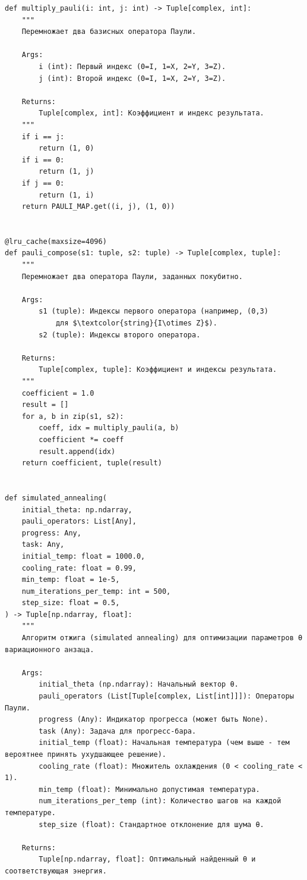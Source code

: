 \documentclass[a4paper]{report}
\begin{document}
\begin{lstlisting}
def multiply_pauli(i: int, j: int) -> Tuple[complex, int]:
    """
    Перемножает два базисных оператора Паули.

    Args:
        i (int): Первый индекс (0=I, 1=X, 2=Y, 3=Z).
        j (int): Второй индекс (0=I, 1=X, 2=Y, 3=Z).

    Returns:
        Tuple[complex, int]: Коэффициент и индекс результата.
    """
    if i == j:
        return (1, 0)
    if i == 0:
        return (1, j)
    if j == 0:
        return (1, i)
    return PAULI_MAP.get((i, j), (1, 0))


@lru_cache(maxsize=4096)
def pauli_compose(s1: tuple, s2: tuple) -> Tuple[complex, tuple]:
    """
    Перемножает два оператора Паули, заданных покубитно.

    Args:
        s1 (tuple): Индексы первого оператора (например, (0,3)
            для $\textcolor{string}{I\otimes Z}$).
        s2 (tuple): Индексы второго оператора.

    Returns:
        Tuple[complex, tuple]: Коэффициент и индексы результата.
    """
    coefficient = 1.0
    result = []
    for a, b in zip(s1, s2):
        coeff, idx = multiply_pauli(a, b)
        coefficient *= coeff
        result.append(idx)
    return coefficient, tuple(result)


def simulated_annealing(
    initial_theta: np.ndarray,
    pauli_operators: List[Any],
    progress: Any,
    task: Any,
    initial_temp: float = 1000.0,
    cooling_rate: float = 0.99,
    min_temp: float = 1e-5,
    num_iterations_per_temp: int = 500,
    step_size: float = 0.5,
) -> Tuple[np.ndarray, float]:
    """
    Алгоритм отжига (simulated annealing) для оптимизации параметров θ вариационного анзаца.

    Args:
        initial_theta (np.ndarray): Начальный вектор θ.
        pauli_operators (List[Tuple[complex, List[int]]]): Операторы Паули.
        progress (Any): Индикатор прогресса (может быть None).
        task (Any): Задача для прогресс-бара.
        initial_temp (float): Начальная температура (чем выше - тем вероятнее принять ухудшающее решение).
        cooling_rate (float): Множитель охлаждения (0 < cooling_rate < 1).
        min_temp (float): Минимально допустимая температура.
        num_iterations_per_temp (int): Количество шагов на каждой температуре.
        step_size (float): Стандартное отклонение для шума θ.

    Returns:
        Tuple[np.ndarray, float]: Оптимальный найденный θ и соответствующая энергия.


\end{lstlisting}
\end{document}
